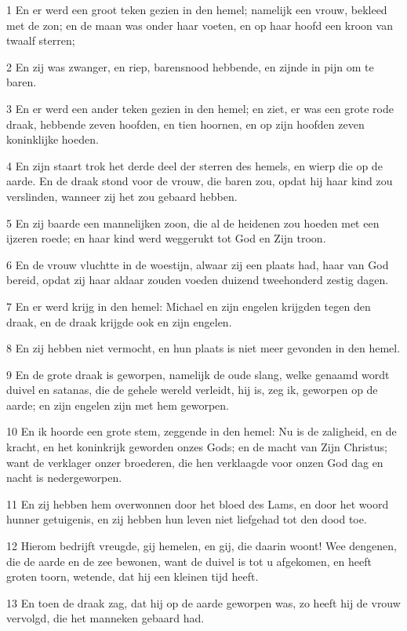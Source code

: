 \par 1 En er werd een groot teken gezien in den hemel; namelijk een vrouw, bekleed met de zon; en de maan was onder haar voeten, en op haar hoofd een kroon van twaalf sterren;
\par 2 En zij was zwanger, en riep, barensnood hebbende, en zijnde in pijn om te baren.
\par 3 En er werd een ander teken gezien in den hemel; en ziet, er was een grote rode draak, hebbende zeven hoofden, en tien hoornen, en op zijn hoofden zeven koninklijke hoeden.
\par 4 En zijn staart trok het derde deel der sterren des hemels, en wierp die op de aarde. En de draak stond voor de vrouw, die baren zou, opdat hij haar kind zou verslinden, wanneer zij het zou gebaard hebben.
\par 5 En zij baarde een mannelijken zoon, die al de heidenen zou hoeden met een ijzeren roede; en haar kind werd weggerukt tot God en Zijn troon.
\par 6 En de vrouw vluchtte in de woestijn, alwaar zij een plaats had, haar van God bereid, opdat zij haar aldaar zouden voeden duizend tweehonderd zestig dagen.
\par 7 En er werd krijg in den hemel: Michael en zijn engelen krijgden tegen den draak, en de draak krijgde ook en zijn engelen.
\par 8 En zij hebben niet vermocht, en hun plaats is niet meer gevonden in den hemel.
\par 9 En de grote draak is geworpen, namelijk de oude slang, welke genaamd wordt duivel en satanas, die de gehele wereld verleidt, hij is, zeg ik, geworpen op de aarde; en zijn engelen zijn met hem geworpen.
\par 10 En ik hoorde een grote stem, zeggende in den hemel: Nu is de zaligheid, en de kracht, en het koninkrijk geworden onzes Gods; en de macht van Zijn Christus; want de verklager onzer broederen, die hen verklaagde voor onzen God dag en nacht is nedergeworpen.
\par 11 En zij hebben hem overwonnen door het bloed des Lams, en door het woord hunner getuigenis, en zij hebben hun leven niet liefgehad tot den dood toe.
\par 12 Hierom bedrijft vreugde, gij hemelen, en gij, die daarin woont! Wee dengenen, die de aarde en de zee bewonen, want de duivel is tot u afgekomen, en heeft groten toorn, wetende, dat hij een kleinen tijd heeft.
\par 13 En toen de draak zag, dat hij op de aarde geworpen was, zo heeft hij de vrouw vervolgd, die het manneken gebaard had.
